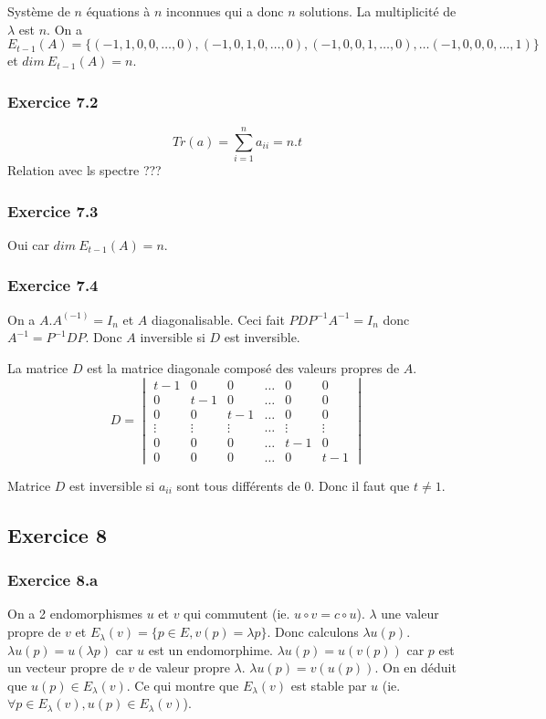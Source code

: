 \documentclass[]{book}
\theoremstyle{definition}
\begin{document}
Syst\`eme de $n$ \'equations \`a $n$ inconnues qui a donc $n$ solutions. La multiplicit\'e de $\lambda$ est $n$. On a $E_{t-1}(A) = \{(-1,1,0,0,\ldots,0),(-1,0,1,0,\ldots,0), (-1,0,0,1,\ldots,0), \dots (-1,0,0,0,\ldots,1)\}$ et $dim\ E_{t-1}(A) = n$. 

\subsubsection*{Exercice 7.2}
$$Tr(a)=\sum_{i=1}^{n}a_{ii} = n.t$$ 
Relation avec ls spectre ???

\subsubsection*{Exercice 7.3}
Oui car $dim\ E_{t-1}(A) = n$.

\subsubsection*{Exercice 7.4}
On a $A.A^(-1) = I_n$ et $A$ diagonalisable. Ceci fait $PDP^{-1}A^{-1} = I_n$ donc $A^{-1} = P^{-1}DP$. Donc $A$ inversible si $D$ est inversible.
 
La matrice $D$ est la matrice diagonale compos\'e des valeurs propres de $A$. 
$$D=\begin{vmatrix} t-1 & 0 & 0 & \ldots & 0 & 0 \\ 0 & t-1 & 0 & \ldots & 0 & 0 \\ 0 & 0 & t-1 & \ldots & 0 & 0 \\ \vdots & \vdots & \vdots & \ldots & \vdots & \vdots \\ 0 & 0 & 0 & \ldots & t-1 & 0 \\ 0 & 0 & 0 & \ldots & 0 & t-1 \end{vmatrix}$$

Matrice $D$ est inversible si $a_{ii}$ sont tous diff\'erents de 0. Donc il faut que $t \neq 1$.


\subsection*{Exercice 8}
\subsubsection*{Exercice 8.a}
On a 2 endomorphismes $u$ et $v$ qui commutent (ie. $u \circ v = c \circ u$). $\lambda$ une valeur propre de $v$ et $E_{\lambda}(v) = \{p \in E, v(p) = \lambda p\}$. Donc calculons $\lambda u(p)$.  $\lambda u(p) = u(\lambda p)$ car $u$ est un endomorphime. $\lambda u(p) = u(v(p))$ car $p$ est un vecteur propre de $v$ de valeur propre $\lambda$. $\lambda u(p) = v(u(p))$. On en d\'eduit que $u(p) \in E_{\lambda}(v)$. Ce qui montre que $E_{\lambda}(v)$ est stable par $u$ (ie. $\forall p \in E_{\lambda}(v), u(p) \in E_{\lambda}(v)$).
\end{document}
